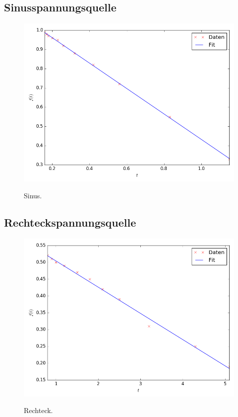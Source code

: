 \subsection{Sinusspannungsquelle}

\begin{figure}[H]
  \centering
  \caption{Sinus.}
  \includegraphics[width=\linewidth-150pt,height=\textheight-150pt,keepaspectratio]{Sinus.png}
  \label{fig:Sinus}
\end{figure}


\subsection{Rechteckspannungsquelle}

\begin{figure}[H]
	\centering
	\caption{Rechteck.}
	\includegraphics[width=\linewidth-150pt,height=\textheight-150pt,keepaspectratio]{Rechteck.png}
	\label{fig:Rechteck}
\end{figure}



